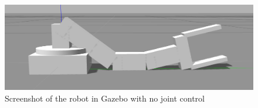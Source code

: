 \begin{figure}[htbp]
  \centering
  \includegraphics[width=.9\textwidth]{img/gazeG.png}
  \caption{Screenshot of the robot in Gazebo with no joint control}
  \label{fig:flaccid}
\end{figure}

\begin{figure}[htbp]
    \centering
    \begin{subfigure}[htbp]{0.45\textwidth}
        \centering

\end{subfigure}
\end{figure}
